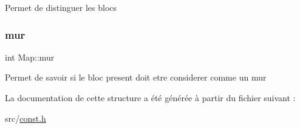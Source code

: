 Permet de distinguer les blocs \mbox{\label{structMap_a46b4593100d53988723525ed5cc28c1f}} 
\subsubsection{\texorpdfstring{mur}{mur}}
{\footnotesize\ttfamily int Map\+::mur}

Permet de savoir si le bloc present doit etre considerer comme un mur 

La documentation de cette structure a été générée à partir du fichier suivant \+:\begin{DoxyCompactItemize}
\item 
src/\hyperlink{const_8h}{const.\+h}\end{DoxyCompactItemize}
